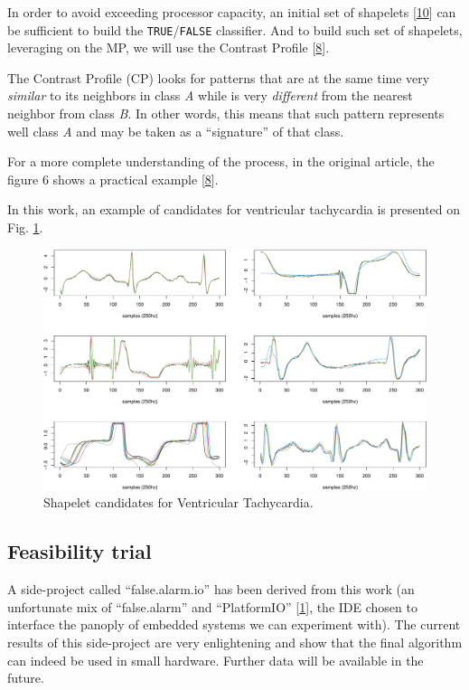 \documentclass[runningheads]{llncs}
\begin{document}
In order to avoid exceeding processor capacity, an initial set of shapelets {[}\protect\hyperlink{ref-Rakthanmanon2013}{10}{]} can
be sufficient to build the \texttt{TRUE}/\texttt{FALSE} classifier. And to build such set of shapelets, leveraging
on the MP, we will use the Contrast Profile {[}\protect\hyperlink{ref-Mercer2021}{8}{]}.

The Contrast Profile (CP) looks for patterns that are at the same time very \emph{similar} to its
neighbors in class \emph{A} while is very \emph{different} from the nearest neighbor from class \emph{B}. In other
words, this means that such pattern represents well class \emph{A} and may be taken as a ``signature'' of
that class.

For a more complete understanding of the process, in the original article, the figure 6 shows a
practical example {[}\protect\hyperlink{ref-Mercer2021}{8}{]}.

In this work, an example of candidates for ventricular tachycardia is presented on Fig. \ref{fig:vtachy}.

\begin{figure}

{\centering \includegraphics[width=0.9\linewidth]{epia2022_files/figure-latex/vtachy-1} 

}

\caption{Shapelet candidates for Ventricular Tachycardia.}\label{fig:vtachy}
\end{figure}

\hypertarget{feasibility-trial}{%
\subsection{Feasibility trial}\label{feasibility-trial}}

A side-project called ``false.alarm.io'' has been derived from this work (an unfortunate mix of
``false.alarm'' and ``PlatformIO'' {[}\protect\hyperlink{ref-PlatformIO}{1}{]}, the IDE chosen to interface the panoply of embedded
systems we can experiment with). The current results of this side-project are very enlightening and
show that the final algorithm can indeed be used in small hardware. Further data will be available
in the future.
\end{document}
